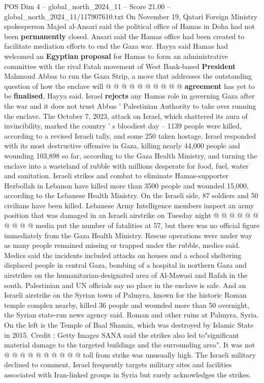 \begin{textsample}{POS Dim 4 – global\_north\_2024\_11 – Score 21.00 – global\_north\_2024\_11/117907610.txt}
On November 19, Qatari Foreign Ministry spokesperson Majed al-Ansari said the political office of Hamas in Doha had not been \textbf{permanently} closed.
Ansari said the Hamas office had been created to facilitate mediation efforts to end the Gaza war.
Hayya said Hamas had welcomed an \textbf{Egyptian} \textbf{proposal} for Hamas to form an administrative committee with the rival Fatah movement of West Bank-based \textbf{President} Mahmoud Abbas to run the Gaza Strip, a move that addresses the outstanding question of how the enclave will @ @ @ @ @ @ @ @ @ @ \textbf{agreement} has yet to be \textbf{finalised}, Hayya said.
Israel \textbf{rejects} any Hamas role in governing Gaza after the war and it does not trust Abbas ' Palestinian Authority to take over running the enclave.
The October 7, 2023, attack on Israel, which shattered its aura of invincibility, marked the country ' s bloodiest day -- 1139 people were killed, according to a revised Israeli tally, and some 250 taken hostage.
Israel responded with its most destructive offensive in Gaza, killing nearly 44,000 people and wounding 103,898 so far, according to the Gaza Health Ministry, and turning the enclave into a wasteland of rubble with millions desperate for food, fuel, water and sanitation.
Israeli strikes and combat to eliminate Hamas-supporter Hezbollah in Lebanon have killed more than 3500 people and wounded 15,000, according to the Lebanese Health Ministry.
On the Israeli side, 87 soldiers and 50 civilians have been killed.
Lebanese Army Intelligence members inspect an army position that was damaged in an Israeli airstrike on Tuesday night @ @ @ @ @ @ @ @ @ @ media put the number of fatalities at 57, but there was no official figure immediately from the Gaza Health Ministry.
Rescue operations were under way as many people remained missing or trapped under the rubble, medics said.
Medics said the incidents included attacks on houses and a school sheltering displaced people in central Gaza, bombing of a hospital in northern Gaza and airstrikes on the humanitarian-designated area of Al-Mawasi and Rafah in the south.
Palestinian and UN officials say no place in the enclave is safe.
And an Israeli airstrike on the Syrian town of Palmyra, known for the historic Roman temple complex nearby, killed 36 people and wounded more than 50 overnight, the Syrian state-run news agency said.
Roman and other ruins at Palmyra, Syria.
On the left is the Temple of Baal Shamin, which was destroyed by Islamic State in 2015.
Credit : Getty Images SANA said the strikes also led to"significant material damage to the targeted buildings and the surrounding area".
It was not @ @ @ @ @ @ @ @ @ @ toll from strike was unusually high.
The Israeli military declined to comment.
Israel frequently targets military sites and facilities associated with Iran-linked groups in Syria but rarely acknowledges the strikes.

\end{textsample}
